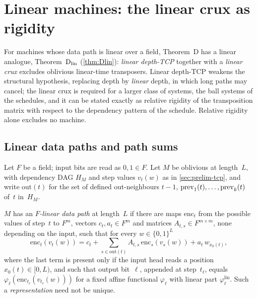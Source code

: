 \section{Linear machines: the linear crux as rigidity}\label{sec:linear}

For machines whose data path is linear over a field, Theorem~D has a linear analogue, Theorem~$\mathrm{D}_{\mathrm{lin}}$ (\cref{thm:Dlin}):
\emph{linear depth-TCP} together with a \emph{linear crux} excludes oblivious linear-time transposers. Linear depth-TCP weakens
the structural hypothesis, replacing depth by \emph{linear} depth, in which long paths may cancel; the linear crux is required
for a larger class of systems, the ball systems of the schedules, and it can be stated exactly as relative rigidity of the
transposition matrix with respect to the dependency pattern of the schedule. Relative rigidity alone excludes no machine.

\subsection{Linear data paths and path sums}\label{sec:lin-setting}

Let $F$ be a field; input bits are read as $0,1\in F$. Let $M$ be oblivious at length~$L$, with dependency DAG $H_M$ and step
values $v_t(w)$ as in \cref{sec:prelim-tcp}, and write $\mathrm{out}(t)$ for the set of defined out-neighbours $t-1$,
$\mathrm{prev}_1(t),\dots,\mathrm{prev}_k(t)$ of~$t$ in~$H_M$.

\begin{definition}\label{def:linear-path}
$M$ has an \emph{$F$-linear data path} at length~$L$ if there are maps $\mathrm{enc}_t$ from the possible values of step~$t$ to
$F^m$, vectors $c_t,a_t\in F^m$ and matrices $A_{t,s}\in F^{m\times m}$, none depending on the input, such that for every
$w\in\{0,1\}^L$
\[
  \mathrm{enc}_t(v_t(w))=c_t+\sum_{s\in\mathrm{out}(t)}A_{t,s}\,\mathrm{enc}_s(v_s(w))+a_t\,w_{x_0(t)},
\]
where the last term is present only if the input head reads a position $x_0(t)\in[0,L)$, and such that output bit~$\ell$,
appended at step~$t_\ell$, equals $\varphi_\ell(\mathrm{enc}_{t_\ell}(v_{t_\ell}(w)))$ for a fixed affine functional
$\varphi_\ell$ with linear part $\varphi_\ell^{\mathrm{lin}}$. Such a \emph{representation} need not be unique.
\end{definition}

